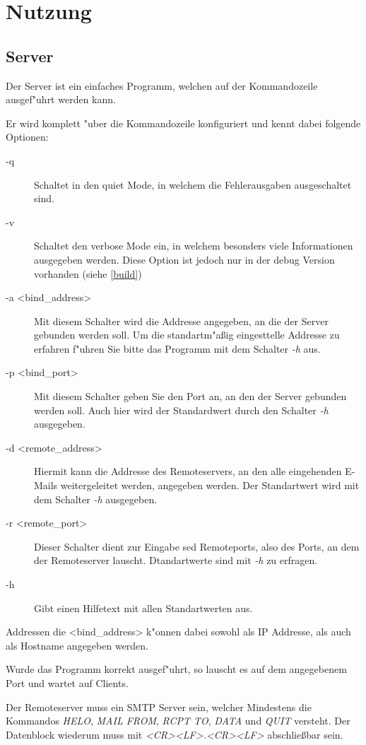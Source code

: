 \documentclass[pdftex,final,a4paper,10pt,notitlepage,halfparskip]{scrreprt}
\begin{document}
\chapter{Nutzung}
\section{Server}
Der Server ist ein einfaches Programm, welchen auf der Kommandozeile ausgef"{u}hrt werden kann.

Er wird komplett "{u}ber die Kommandozeile konfiguriert und kennt dabei folgende Optionen:
\begin{description}
  \item[-q] Schaltet in den quiet Mode, in welchem die Fehlerausgaben ausgeschaltet sind.
  \item[-v] Schaltet den verbose Mode ein, in welchem besonders viele Informationen ausgegeben werden. Diese Option ist jedoch nur in der debug Version vorhanden (siehe \ref{build})
  \item[-a <bind\_address>] Mit diesem Schalter wird die Addresse angegeben, an die der Server gebunden werden soll. Um die standartm"{a}ßig eingesttelle Addresse zu erfahren f"{u}hren Sie bitte das Programm mit dem Schalter \textit{-h} aus. 
  \item[-p <bind\_port>] Mit diesem Schalter geben Sie den Port an, an den der Server gebunden werden soll. Auch hier wird der Standardwert durch den Schalter \textit{-h} ausgegeben.
  \item[-d <remote\_address>] Hiermit kann die Addresse des Remoteservers, an den alle eingehenden E-Mails weitergeleitet werden, angegeben werden. Der Standartwert wird mit dem Schalter \textit{-h} ausgegeben.
  \item[-r <remote\_port>] Dieser Schalter dient zur Eingabe sed Remoteports, also des Ports, an dem der Remoteserver lauscht. Dtandartwerte sind mit \textit{-h} zu erfragen.
  \item[-h] Gibt einen Hilfetext mit allen Standartwerten aus. 
\end{description}
Addressen die <bind\_address> k"{o}nnen dabei sowohl als IP Addresse, als auch als Hostname angegeben werden.

Wurde das Programm korrekt ausgef"{u}hrt, so lauscht es auf dem angegebenem Port und wartet auf Clients.

Der Remoteserver muss ein SMTP Server sein, welcher Mindestens die Kommandos \textit{HELO}, \textit{MAIL FROM}, \textit{RCPT TO}, \textit{DATA} und \textit{QUIT} versteht. Der Datenblock wiederum muss mit \textit{<CR><LF>.<CR><LF>} abschließbar sein.
\end{document}
